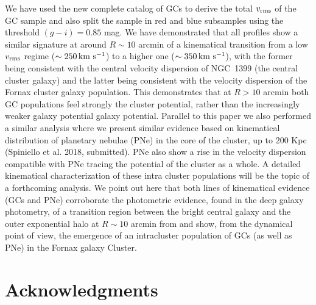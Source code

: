 \documentclass[useAMS,usenatbib]{mn2e}
\newcommand{\kms}{\mbox{\,km~s$^{-1}$}}
\begin{document}
We have used the new complete catalog of GCs to derive the total  $v_{\rm rms}$ 
of the GC sample and also split the sample in red and blue subsamples using
the threshold $(g - i) = 0.85$ mag.
We have demonstrated that all profiles show a similar signature at around 
$R\sim10$ arcmin of a kinematical transition from a low $v_{\rm rms}$ regime ($\sim 250 \kms$) to a 
higher one ($\sim 350 \kms$), with the former being consistent with the central velocity 
dispersion of NGC~1399 (the central cluster galaxy) and the latter being 
consistent with the velocity dispersion of the Fornax cluster galaxy population. This 
demonstrates that at $R>10$ arcmin both GC populations feel strongly the cluster 
potential, rather than the increasingly weaker galaxy potential galaxy potential. Parallel to this paper 
we also performed a similar analysis where we present similar evidence based on 
kinematical distribution of planetary nebulae (PNe) in the core of the cluster, 
up to 200 Kpc (Spiniello et al. 2018, submitted). PNe also show a rise in the 
velocity dispersion compatible with PNe tracing the potential of the cluster as 
a whole. A detailed kinematical characterization of these intra cluster populations will 
be the topic of a forthcoming analysis. We point out here that both lines of kinematical 
evidence (GCs and PNe) corroborate the photometric evidence, found in the deep 
galaxy photometry, of a transition region between the bright central galaxy and 
the outer exponential halo at $R\sim10$ arcmin from \citet{Iodice16} and 
show, from the dynamical point of view, the emergence of an intracluster 
population of GCs (as well as PNe) in the Fornax galaxy Cluster.

\section*{Acknowledgments}
\end{document}
